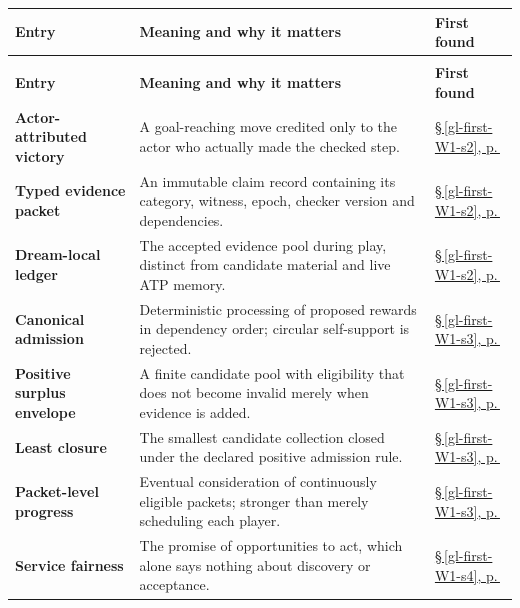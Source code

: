 \documentclass[11pt,letterpaper]{article}
\begin{document}
\begin{longtable}{@{}>{\raggedright\arraybackslash}p{.215\linewidth}>{\raggedright\arraybackslash}p{.585\linewidth}>{\raggedright\arraybackslash}p{.14\linewidth}@{}}
\toprule
\textbf{Entry} & \textbf{Meaning and why it matters} & \textbf{First found} \\
\midrule\endfirsthead
\multicolumn{3}{@{}l}{\footnotesize \emph{Argot: Specialized Terms (continued)}}\\
\toprule\textbf{Entry} & \textbf{Meaning and why it matters} & \textbf{First found} \\
\midrule\endhead
\bottomrule\endfoot
\textbf{Actor-attributed victory} & A goal-reaching move credited only to the actor who actually made the checked step. & \hyperref[gl-first-W1-s2]{\S\,\ref*{gl-first-W1-s2}, p.\,\pageref*{gl-first-W1-s2}} \\
\textbf{Typed evidence packet} & An immutable claim record containing its category, witness, epoch, checker version and dependencies. & \hyperref[gl-first-W1-s2]{\S\,\ref*{gl-first-W1-s2}, p.\,\pageref*{gl-first-W1-s2}} \\
\textbf{Dream-local ledger} & The accepted evidence pool during play, distinct from candidate material and live ATP memory. & \hyperref[gl-first-W1-s2]{\S\,\ref*{gl-first-W1-s2}, p.\,\pageref*{gl-first-W1-s2}} \\
\textbf{Canonical admission} & Deterministic processing of proposed rewards in dependency order; circular self-support is rejected. & \hyperref[gl-first-W1-s3]{\S\,\ref*{gl-first-W1-s3}, p.\,\pageref*{gl-first-W1-s3}} \\
\textbf{Positive surplus envelope} & A finite candidate pool with eligibility that does not become invalid merely when evidence is added. & \hyperref[gl-first-W1-s3]{\S\,\ref*{gl-first-W1-s3}, p.\,\pageref*{gl-first-W1-s3}} \\
\textbf{Least closure} & The smallest candidate collection closed under the declared positive admission rule. & \hyperref[gl-first-W1-s3]{\S\,\ref*{gl-first-W1-s3}, p.\,\pageref*{gl-first-W1-s3}} \\
\textbf{Packet-level progress} & Eventual consideration of continuously eligible packets; stronger than merely scheduling each player. & \hyperref[gl-first-W1-s3]{\S\,\ref*{gl-first-W1-s3}, p.\,\pageref*{gl-first-W1-s3}} \\
\textbf{Service fairness} & The promise of opportunities to act, which alone says nothing about discovery or acceptance. & \hyperref[gl-first-W1-s4]{\S\,\ref*{gl-first-W1-s4}, p.\,\pageref*{gl-first-W1-s4}} \\

\end{longtable}
\end{document}
